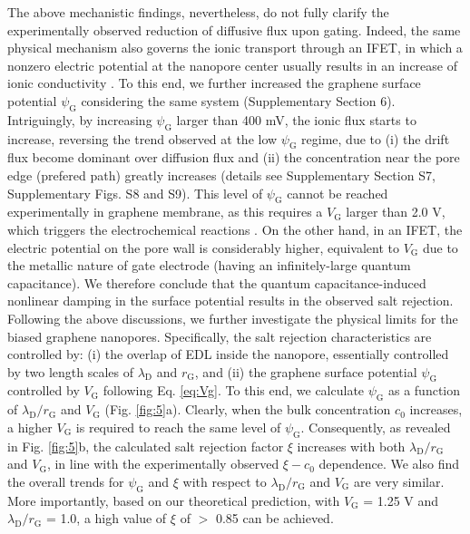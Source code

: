 \documentclass[journal=langd5,email=true, hyperref=true, keywords=false]{achemso}
\newcommand{\Fig}{Fig.}
\begin{document}
The above mechanistic findings, nevertheless, do not fully clarify the
experimentally observed reduction of diffusive flux upon
gating. Indeed, the same physical mechanism also governs the ionic
transport through an IFET, in which a nonzero electric potential at
the nanopore center usually results in an increase of ionic
conductivity \cite{Nam_2009,Lee_2015,Feng_2016}. To this end, we
further increased the graphene surface potential $\psi_{\mathrm{G}}$
considering the same system (Supplementary Section 6). Intriguingly,
by increasing $\psi_{\mathrm{G}}$ larger than 400 mV, the ionic flux
starts to increase, reversing the trend observed at the low
$\psi_{\mathrm{G}}$ regime, due to (i) the drift flux become dominant
over diffusion flux and (ii) the concentration near the pore edge
(prefered path) greatly increases (details see Supplementary Section
S7, Supplementary Figs. S8 and S9). This level of $\psi_{\mathrm{G}}$
cannot be reached experimentally in graphene membrane, as this
requires a $V_{\mathrm{G}}$ larger than 2.0 V, which triggers the
electrochemical reactions \cite{Toh_2011}. On the other hand, in an
IFET, the electric potential on the pore wall is considerably higher,
equivalent to $V_{\mathrm{G}}$ due to the metallic nature of gate
electrode (having an infinitely-large quantum capacitance). We
therefore conclude that the quantum capacitance-induced nonlinear
damping in the surface potential results in the observed salt
rejection.  Following the above discussions, we further investigate
the physical limits for the biased graphene nanopores. Specifically,
the salt rejection characteristics are controlled by: (i) the overlap
of EDL inside the nanopore, essentially controlled by two length
scales of $\lambda_{\mathrm{D}}$ and $r_{\mathrm{G}}$, and (ii) the
graphene surface potential $\psi_{\mathrm{G}}$ controlled by
$V_{\mathrm{G}}$ following Eq. \eqref{eq:Vg}. To this end, we
calculate $\psi_{\mathrm{G}}$ as a function of
$\lambda_{\mathrm{D}} / r_{\mathrm{G}}$ and $V_{\mathrm{G}}$ (\Fig{}
\ref{fig:5}a). Clearly, when the bulk concentration $c_{0}$ increases,
a higher $V_{\mathrm{G}}$ is required to reach the same level of
$\psi_{\mathrm{G}}$. Consequently, as revealed in \Fig{} \ref{fig:5}b,
the calculated salt rejection factor $\xi$ increases with both
$\lambda_{\mathrm{D}} / r_{\mathrm{G}}$ and $V_{\mathrm{G}}$, in line
with the experimentally observed $\xi - c_{0}$ dependence. We also
find the overall trends for $\psi_{\mathrm{G}}$ and $\xi$ with respect
to $\lambda_{\mathrm{D}}/r_{\mathrm{G}}$ and $V_{\mathrm{G}}$ are very
similar. More importantly, based on our theoretical prediction, with
$V_{\mathrm{G}}$ = 1.25 V and $\lambda_{\mathrm{D}} / r_{\mathrm{G}}$
= 1.0, a high value of $\xi$ of $>$ 0.85 can be achieved.
\end{document}
